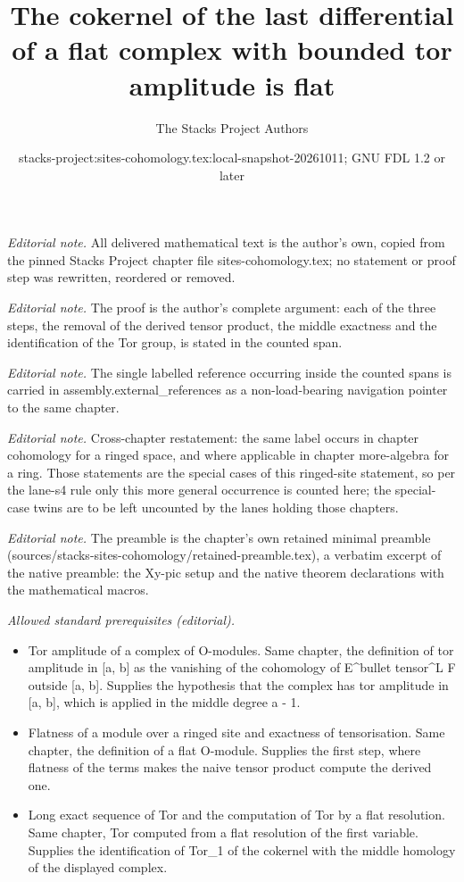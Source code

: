 \documentclass[10pt,a4paper]{amsart}
\title{The cokernel of the last differential of a flat complex with bounded tor amplitude is flat}
\author{The Stacks Project Authors}
\date{stacks-project:sites-cohomology.tex:local-snapshot-20261011; GNU FDL 1.2 or later}
\theoremstyle{plain}
\theoremstyle{definition}
\theoremstyle{remark}
\numberwithin{equation}{subsection}
\begin{document}
\maketitle
\noindent\textit{Editorial note.} All delivered mathematical text is the author's own, copied from the pinned Stacks Project chapter file sites-cohomology.tex; no statement or proof step was rewritten, reordered or removed.\par\medskip
\noindent\textit{Editorial note.} The proof is the author's complete argument: each of the three steps, the removal of the derived tensor product, the middle exactness and the identification of the Tor group, is stated in the counted span.\par\medskip
\noindent\textit{Editorial note.} The single labelled reference occurring inside the counted spans is carried in assembly.external\_references as a non-load-bearing navigation pointer to the same chapter.\par\medskip
\noindent\textit{Editorial note.} Cross-chapter restatement: the same label occurs in chapter cohomology for a ringed space, and where applicable in chapter more-algebra for a ring. Those statements are the special cases of this ringed-site statement, so per the lane-s4 rule only this more general occurrence is counted here; the special-case twins are to be left uncounted by the lanes holding those chapters.\par\medskip
\noindent\textit{Editorial note.} The preamble is the chapter's own retained minimal preamble (sources/stacks-sites-cohomology/retained-preamble.tex), a verbatim excerpt of the native preamble: the Xy-pic setup and the native theorem declarations with the mathematical macros.\par\medskip
\noindent\textit{Allowed standard prerequisites (editorial).}\begin{itemize}
\item Tor amplitude of a complex of O-modules. Same chapter, the definition of tor amplitude in [a, b] as the vanishing of the cohomology of E\textasciicircum{}bullet tensor\textasciicircum{}L F outside [a, b]. Supplies the hypothesis that the complex has tor amplitude in [a, b], which is applied in the middle degree a - 1.
\item Flatness of a module over a ringed site and exactness of tensorisation. Same chapter, the definition of a flat O-module. Supplies the first step, where flatness of the terms makes the naive tensor product compute the derived one.
\item Long exact sequence of Tor and the computation of Tor by a flat resolution. Same chapter, Tor computed from a flat resolution of the first variable. Supplies the identification of Tor\_1 of the cokernel with the middle homology of the displayed complex.
\end{itemize}\medskip
\end{document}
